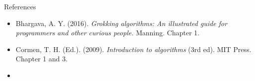\documentclass[
  ignorenonframetext,
]{beamer}
\begin{document}
\begin{frame}{References}
\protect\hypertarget{references}{}
\begin{itemize}
\item
  Bhargava, A. Y. (2016). \emph{Grokking algorithms: An illustrated
  guide for programmers and other curious people.} Manning. Chapter 1.
\item
  Cormen, T. H. (Ed.). (2009). \emph{Introduction to algorithms} (3rd
  ed). MIT Press. Chapter 1 and 3.
\item
\end{itemize}
\end{frame}
\end{document}
